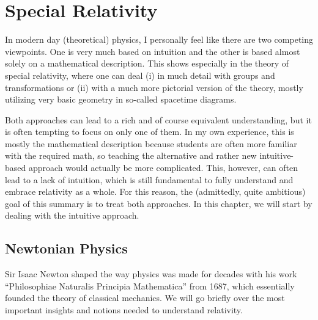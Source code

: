 \documentclass[../relativity_main.tex]{subfiles}
\begin{document}
\chapter{Special Relativity}


\begin{center}
In modern day (theoretical) physics, I personally feel like there are two competing viewpoints. One is very much based on intuition and the other is based almost solely on a mathematical description. This shows especially in the theory of special relativity, where one can deal (i) in much detail with groups and transformations or (ii) with a much more pictorial version of the theory, mostly utilizing very basic geometry in so-called spacetime diagrams.

Both approaches can lead to a rich and of course equivalent understanding, but it is often tempting to focus on only one of them. In my own experience, this is mostly the mathematical description because students are often more familiar with the required math, so teaching the alternative and rather new intuitive-based approach would actually be more complicated. This, however, can often lead to a lack of intuition, which is still fundamental to fully understand and embrace relativity as a whole. For this reason, the (admittedly, quite ambitious) goal of this summary is to treat both approaches. In this chapter, we will start by dealing with the intuitive approach.
\end{center}





\newpage



	\section{Newtonian Physics}
Sir Isaac Newton shaped the way physics was made for decades with his work \enquote{Philosophiae Naturalis Principia Mathematica} from 1687, which essentially founded the theory of classical mechanics. We will go briefly over the most important insights and notions needed to understand relativity.
\end{document}
